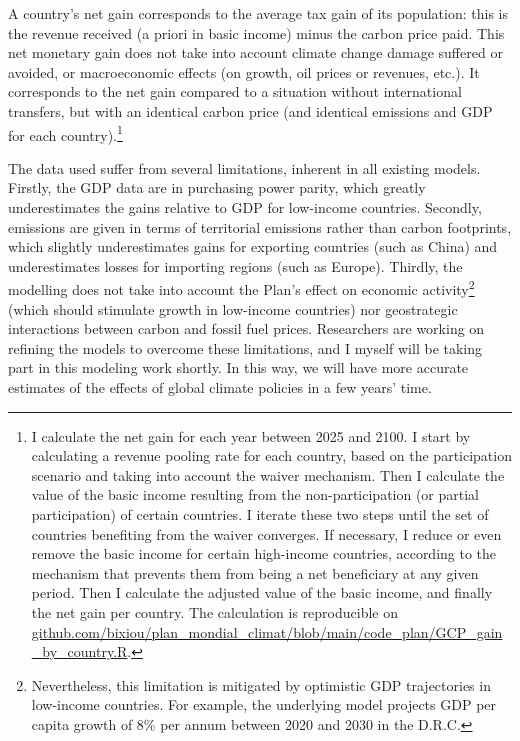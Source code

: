 \documentclass[a5paper,english,openany]{memoir}
\begin{document}
A country's net gain corresponds to the average tax gain of its population: this is the revenue received (a priori in basic income) minus the carbon price paid. This net monetary gain does not take into account climate change damage suffered or avoided, or macroeconomic effects (on growth, oil prices or revenues, etc.). It corresponds to the net gain compared to a situation without international transfers, but with an identical carbon price (and identical emissions and GDP for each country).\footnote{I calculate the net gain for each year between 2025 and 2100.   
I start by calculating a revenue pooling rate for each country, based on the participation scenario and taking into account the waiver mechanism. Then I calculate the value of the basic income resulting from the non-participation (or partial participation) of certain countries. I iterate these two steps until the set of countries benefiting from the waiver converges. 
If necessary, I reduce or even remove the basic income for certain high-income countries,  according to the mechanism that prevents them from being a net beneficiary at any given period. Then I calculate the adjusted value of the basic income, and finally the net gain per country. The calculation is reproducible on \href{https://github.com/bixiou/plan_mondial_climat/blob/main/code_plan/GCP_gain_by_country.R}{github.com/bixiou/plan\_mondial\_climat/blob/main/code\_plan/GCP\_gain\_by\_country.R}.}

The data used suffer from several limitations, inherent in all existing models. Firstly, the GDP data are in purchasing power parity, which greatly underestimates the gains relative to GDP for low-income countries. Secondly, emissions are given in terms of territorial emissions rather than carbon footprints, which slightly underestimates gains for exporting countries (such as China) and underestimates losses for importing regions (such as Europe). 
Thirdly, the modelling does not take into account the Plan's effect on economic activity\footnote{Nevertheless, this limitation is mitigated by optimistic GDP trajectories in low-income countries. For example, the underlying model projects GDP per capita growth of 8\% per annum between 2020 and 2030 in the D.R.C.} (which should stimulate growth in low-income countries) nor geostrategic interactions between carbon and fossil fuel prices. Researchers are working on refining the models to overcome these limitations, and I myself will be taking part in this modeling work shortly. In this way, we will have more accurate estimates of the effects of global climate policies in a few years' time. %
\end{document}
